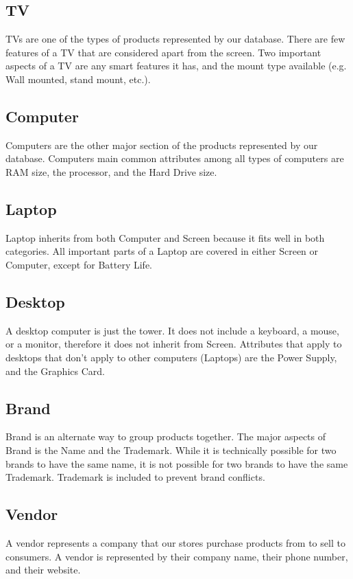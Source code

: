 \documentclass{article}
\begin{document}
		\subsection{TV}
			TVs are one of the types of products represented by our database. There
			are few features of a TV that are considered apart from the screen. Two
			important aspects of a TV are any smart features it has, and the mount
			type available (e.g. Wall mounted, stand mount, etc.).

		\subsection{Computer}
			Computers are the other major section of the products represented by our
			database. Computers main common attributes among all types of computers
			are RAM size, the processor, and the Hard Drive size. 


		\subsection{Laptop}
			Laptop inherits from both Computer and Screen because it fits well in both
			categories. All important parts of a Laptop are covered in either Screen
			or Computer, except for Battery Life.

		\subsection{Desktop}
			A desktop computer is just the tower. It does not include a keyboard, a
			mouse, or a monitor, therefore it does not inherit from Screen. Attributes
			that apply to desktops that don't apply to other computers (Laptops) are
			the Power Supply, and the Graphics Card.

		\subsection{Brand}
			Brand is an alternate way to group products together. The major aspects of
			Brand is the Name and the Trademark. While it is technically possible for
			two brands to have the same name, it is not possible for two brands to
			have the same Trademark. Trademark is included to prevent brand conflicts.

		\subsection{Vendor}
			A vendor represents a company that our stores purchase products from to
			sell to consumers. A vendor is represented by their company name, their
			phone number, and their website.
\end{document}
